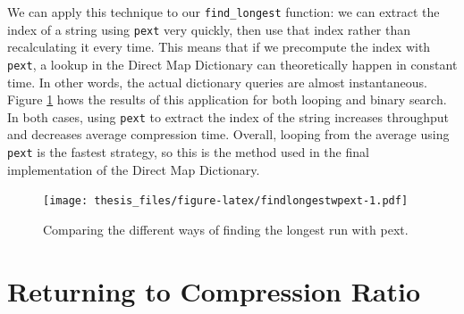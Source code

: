 \documentclass[12pt,twoside]{reedthesis}
\begin{document}
We can apply this technique to our \texttt{find\_longest} function: we can extract the index of a string using \texttt{pext} very quickly, then use that index rather than recalculating it every time. This means that if we precompute the index with \texttt{pext}, a lookup in the Direct Map Dictionary can theoretically happen in constant time. In other words, the actual dictionary queries are almost instantaneous. Figure \ref{fig:findlongestwpext} hows the results of this application for both looping and binary search. In both cases, using \texttt{pext} to extract the index of the string increases throughput and decreases average compression time. Overall, looping from the average using \texttt{pext} is the fastest strategy, so this is the method used in the final implementation of the Direct Map Dictionary.
\begin{figure}
\centering
\texttt{[image: thesis\_files/figure-latex/findlongestwpext-1.pdf]}
\caption{\label{fig:findlongestwpext}Comparing the different ways of finding the longest run with pext.}
\end{figure}
\hypertarget{returning-to-compression-ratio}{%
\section{Returning to Compression Ratio}\label{returning-to-compression-ratio}}
\end{document}
